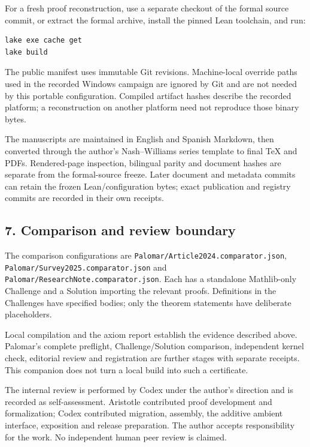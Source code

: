 \documentclass[english,11pt,a4paper]{article}
\begin{document}
For a fresh proof reconstruction, use a separate checkout of the formal source commit, or extract the formal archive, install the pinned Lean toolchain, and run:

\begin{verbatim}
lake exe cache get
lake build
\end{verbatim}

The public manifest uses immutable Git revisions. Machine-local override paths used in the recorded Windows campaign are ignored by Git and are not needed by this portable configuration. Compiled artifact hashes describe the recorded platform; a reconstruction on another platform need not reproduce those binary bytes.

The manuscripts are maintained in English and Spanish Markdown, then converted through the author's Nash--Williams series template to final TeX and PDFs. Rendered-page inspection, bilingual parity and document hashes are separate from the formal-source freeze. Later document and metadata commits can retain the frozen Lean/configuration bytes; exact publication and registry commits are recorded in their own receipts.

\subsection{7. Comparison and review boundary}\label{comparison-and-review-boundary}

The comparison configurations are \texttt{Palomar/\allowbreak{}Article2024.\allowbreak{}comparator.\allowbreak{}json}, \texttt{Palomar/\allowbreak{}Survey2025.\allowbreak{}comparator.\allowbreak{}json} and \texttt{Palomar/\allowbreak{}Research\allowbreak{}Note.\allowbreak{}comparator.\allowbreak{}json}. Each has a standalone Mathlib-only Challenge and a Solution importing the relevant proofs. Definitions in the Challenges have specified bodies; only the theorem statements have deliberate placeholders.

Local compilation and the axiom report establish the evidence described above. Palomar's complete preflight, Challenge/Solution comparison, independent kernel check, editorial review and registration are further stages with separate receipts. This companion does not turn a local build into such a certificate.

The internal review is performed by Codex under the author's direction and is recorded as self-assessment. Aristotle contributed proof development and formalization; Codex contributed migration, assembly, the additive ambient interface, exposition and release preparation. The author accepts responsibility for the work. No independent human peer review is claimed.
\end{document}
